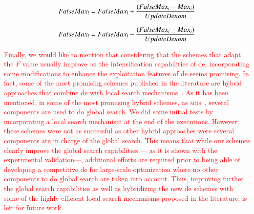 \documentclass[preprint,3p]{elsarticle}
\newcommand{\DE}{{\sc de}}
\begin{document}
\begin{equation}
	\label{eq:update_max_sum}
		FalseMax_i = FalseMax_i + {{(FalseMax_i - Max_i)}\over{UpdateDenom}}
\end{equation}

\begin{equation}
	\label{eq:update_max_substract}
		FalseMax_i = FalseMax_i - {{(FalseMax_i - Max_i)}\over{UpdateDenom}}
\end{equation}

%
%
%
%
%
%
%

\textcolor{red}{
Finally, we would like to mention that considering that the schemes that adapt the $F$ value usually improve on the intensification capabilities of \DE{},
incorporating some modifications to enhance the exploitation features of \DE{} seems promising.
%
In fact, some of the most promising schemes published in the
literature are hybrid approaches that combine \DE{} with local search mechanisms~\cite{LaTorre:14}.
%
As it has been mentioned, in some of the most promising hybrid schemes, as \textsc{mos}~\cite{LaTorre:11}, several components are used to do global search.
%
We did some initial tests by incorporating a local search mechanism at the end of the executions. 
%
However, these schemes were not as successful as other hybrid approaches were several components are in charge of the global search.
%
This means that while our schemes clearly improve the global search capabilities --- as it is shown with the experimental validation---, 
additional efforts are required prior to being able of developing
a competitive \DE{} for large-scale optimization where no other components to do global search are taken into account.
%
Thus, improving further the global search capabilities as well as 
hybridizing the new \DE{} schemes with some of the highly efficient local search mechanisms proposed
in the literature, is left for future work.
}
\end{document}
